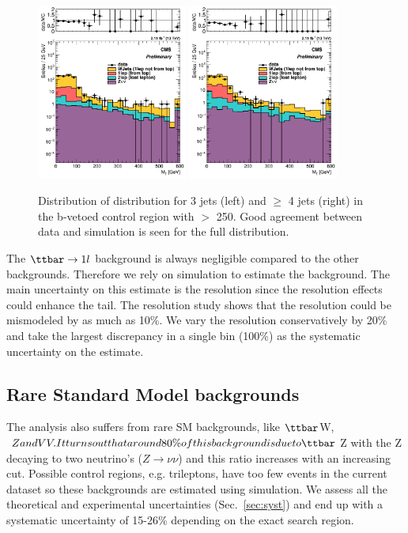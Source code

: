 \begin{figure}[h]
\includegraphics[width=0.44\textwidth]{plots_stop/MTDist_3jets.png}
\includegraphics[width=0.44\textwidth]{plots_stop/MTDist_4jets.png}
\caption{\label{fig:MT} Distribution of \MT distribution for 3 jets (left) and $\ge$ 4 jets (right) in the b-vetoed control region with \MET $>$ 250\GeV. Good agreement between data and simulation is seen for the full distribution.}
\end{figure}

The $\ttbar\rightarrow 1l$ background is always negligible compared to the other backgrounds.  Therefore we rely on simulation to estimate the background.  The main uncertainty on this estimate is the \MET resolution since the resolution effects could enhance the \MT tail.  The \MET resolution study shows that the resolution could be mismodeled by as much as 10\%.  We vary the resolution conservatively by 20\% and take the largest discrepancy in a single \MET bin (100\%) as the systematic uncertainty on the \ttbar estimate.  
\subsection{Rare Standard Model backgrounds}
The analysis also suffers from rare SM backgrounds, like $\ttbar$W, \ttbar$Z and VV.  It turns out that around 80\% of this background is due to \ttbar$Z with the Z decaying to two neutrino's ($Z\rightarrow\nu\nu$) and this ratio increases with an increasing \MET cut.  Possible control regions, e.g. trileptons, have too few events in the current dataset so these backgrounds are estimated using simulation.  We assess all the theoretical and experimental uncertainties (Sec.~\ref{sec:syst}) and end up with a systematic uncertainty of 15-26\% depending on the exact search region.
